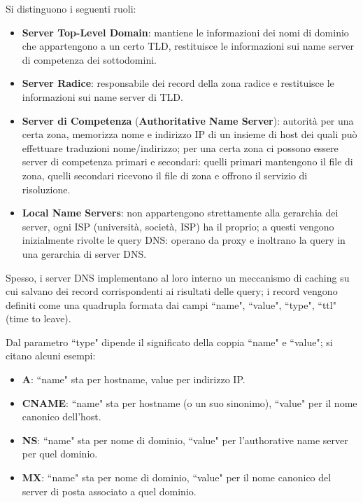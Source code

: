 \documentclass[11pt, italian, openany]{book}
\begin{document}
\begin{sloppypar}
\begin{itemize}[topsep=0pt, itemsep=0pt, parsep=0pt]
	Si distinguono i seguenti ruoli:
	\begin{itemize}[topsep=0pt, itemsep=0pt, parsep=0pt]
		\item \textbf{Server Top-Level Domain}: mantiene le informazioni dei nomi di dominio che appartengono a un certo TLD, restituisce le informazioni
		sui name server di competenza dei sottodomini.
		\item \textbf{Server Radice}: responsabile dei record della zona radice e restituisce le informazioni sui name server di TLD.
		\item \textbf{Server di Competenza} (\textbf{Authoritative Name Server}): autorità per una certa zona, memorizza nome e indirizzo IP di un insieme di
		host dei quali può effettuare traduzioni nome/indirizzo; per una certa zona ci possono essere server di competenza primari e secondari:
		quelli primari mantengono il file di zona, quelli secondari ricevono il file di zona e offrono il servizio di risoluzione.
		\item \textbf{Local Name Servers}: non appartengono strettamente alla gerarchia dei server, ogni ISP (università, società, ISP) ha il proprio; a questi
		vengono inizialmente rivolte le query DNS: operano da proxy e inoltrano la query in una gerarchia di server DNS.
	\end{itemize}

	Spesso, i server DNS implementano al loro interno un meccanismo di caching su cui salvano dei record corrispondenti ai risultati delle query; i record
	vengono definiti come una quadrupla formata dai campi ``name", ``value", ``type", ``ttl" (time to leave).

	Dal parametro ``type" dipende il significato della coppia ``name" e ``value"; si citano alcuni esempi:
	\begin{itemize}[topsep=0pt, itemsep=0pt, parsep=0pt]
		\item \textbf{A}: ``name" sta per hostname, value per indirizzo IP.
		\item \textbf{CNAME}: ``name" sta per hostname (o un suo sinonimo), ``value" per il nome canonico dell'host.
		\item \textbf{NS}: ``name" sta per nome di dominio, ``value" per l'authorative name server per quel dominio.
		\item \textbf{MX}: ``name" sta per nome di dominio, ``value" per il nome canonico del server di posta associato a quel dominio.
	\end{itemize}


\end{itemize}
\end{sloppypar}
\end{document}
